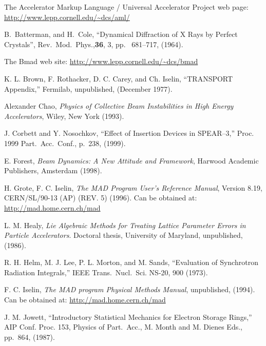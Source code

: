 \begin{thebibliography}{XXX99}

The Accelerator Markup Language / Universal Accelerator Project web page:
\hfill\break
\hspace*{0.3in}
\url{http://www.lepp.cornell.edu/~dcs/aml/}

B.~Batterman, and H.~Cole,
``Dynamical Diffraction of X Rays by Perfect Crystals'',
Rev.\ Mod.\ Phys.,{\bf 36}, 3, pp.~ 681--717, (1964).

The Bmad web site:
\hfill\break
\hspace*{0.3in} \url{http://www.lepp.cornell.edu/~dcs/bmad}

K. L. Brown, F. Rothacker, D. C. Carey, and Ch. Iselin, ``TRANSPORT
Appendix,'' Fermilab, unpublished, (December 1977).

Alexander Chao, {\em Physics of Collective Beam
Instabilities in High Energy Accelerators}, Wiley, New York (1993). 

J. Corbett and Y. Nosochkov, ``Effect of Insertion Devices in SPEAR--3,''
Proc. 1999 Part.\ Acc.\ Conf., p.~238, (1999).

E. Forest, {\em Beam Dynamics: A New Attitude and Framework},
Harwood Academic Publishers, Amsterdam (1998).

H. Grote, F. C. Iselin, {\it The MAD Program User's Reference Manual},
Version 8.19, CERN/SL/90-13 (AP) (REV. 5) (1996). Can be obtained at:
\hfill\break
\hspace*{0.3in}
\url{http://mad.home.cern.ch/mad} 

L. M. Healy, {\it Lie Algebraic Methods for Treating Lattice Parameter
Errors in Particle Accelerators}. Doctoral thesis, University of
Maryland, unpublished, (1986).

R. H. Helm, M. J. Lee, P. L. Morton, and M. Sands, ``Evaluation of Synchrotron
Radiation Integrals,'' IEEE Trans.~Nucl.~Sci. NS-20, 900 (1973).

F. C. Iselin, {\it The MAD program Physical Methods Manual}, 
unpublished, (1994).  Can be obtained at: 
\hfill\break
\hspace*{0.3in}
\url{http://mad.home.cern.ch/mad}

J. M. Jowett, ``Introductory Statistical Mechanics
for Electron Storage Rings,'' AIP Conf. Proc. 153, Physics of Part.\ Acc.,
M. Month and M. Dienes Eds., pp.~864, (1987).


\end{thebibliography}
